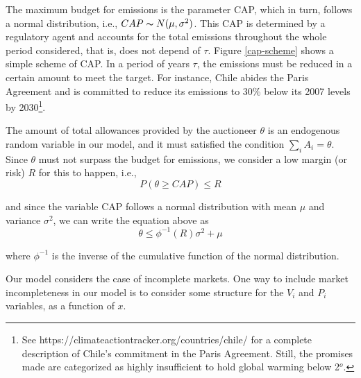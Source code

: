 \documentclass[11pt, letterpaper]{article}
\begin{document}
The maximum budget for emissions is the  parameter CAP, which in turn, follows a normal distribution, i.e., $CAP \thicksim N(\mu, \sigma^2)$. This CAP is determined by a regulatory agent and  accounts for the total emissions throughout the whole period considered, that is, does not depend of $\tau$. Figure \ref{cap-scheme} shows a simple scheme of CAP. In a period of years $\tau$, the emissions must be reduced in a certain amount to meet the target. For instance, Chile abides the Paris Agreement and is committed to reduce its emissions to 30\% below its 2007 levels by 2030\footnote{See https://climateactiontracker.org/countries/chile/ for a complete description of Chile's commitment in the Paris Agreement. Still, the promises made are categorized as highly insufficient to hold global warming below 2$^o$. }.

\smallskip
The amount of total allowances provided by the auctioneer $\theta$ is an endogenous random variable in our model, and it must satisfied the condition $\sum_i A_i = \theta$. 
Since $\theta$ must not surpass the budget for emissions, we consider a low margin (or risk) $R$ for this to happen, i.e.,
\begin{equation}
    P (\theta \geq CAP) \leq R
\end{equation}

and since the variable CAP follows a normal distribution with mean $\mu$ and variance $\sigma^2$, we can write the equation above as
\begin{equation}
    \theta \leq \phi^{-1}(R) \sigma^2 + \mu
\end{equation}

where $\phi^{-1}$ is the inverse of the cumulative function of the normal distribution. 

Our model considers the case of incomplete markets. One way to include market incompleteness in our model is to consider some structure for the $V_i$ and $P_i$ variables, as a function of $x$. 




\hspace{0.5cm}
\end{document}
